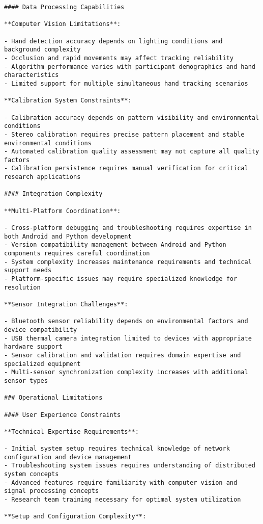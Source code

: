 \documentclass[11pt,a4paper]{report}
\begin{document}
\begin{verbatim}
#### Data Processing Capabilities

**Computer Vision Limitations**:

- Hand detection accuracy depends on lighting conditions and background complexity
- Occlusion and rapid movements may affect tracking reliability
- Algorithm performance varies with participant demographics and hand characteristics
- Limited support for multiple simultaneous hand tracking scenarios

**Calibration System Constraints**:

- Calibration accuracy depends on pattern visibility and environmental conditions
- Stereo calibration requires precise pattern placement and stable environmental conditions
- Automated calibration quality assessment may not capture all quality factors
- Calibration persistence requires manual verification for critical research applications

#### Integration Complexity

**Multi-Platform Coordination**:

- Cross-platform debugging and troubleshooting requires expertise in both Android and Python development
- Version compatibility management between Android and Python components requires careful coordination
- System complexity increases maintenance requirements and technical support needs
- Platform-specific issues may require specialized knowledge for resolution

**Sensor Integration Challenges**:

- Bluetooth sensor reliability depends on environmental factors and device compatibility
- USB thermal camera integration limited to devices with appropriate hardware support
- Sensor calibration and validation requires domain expertise and specialized equipment
- Multi-sensor synchronization complexity increases with additional sensor types

### Operational Limitations

#### User Experience Constraints

**Technical Expertise Requirements**:

- Initial system setup requires technical knowledge of network configuration and device management
- Troubleshooting system issues requires understanding of distributed system concepts
- Advanced features require familiarity with computer vision and signal processing concepts
- Research team training necessary for optimal system utilization

**Setup and Configuration Complexity**:


\end{verbatim}
\end{document}
